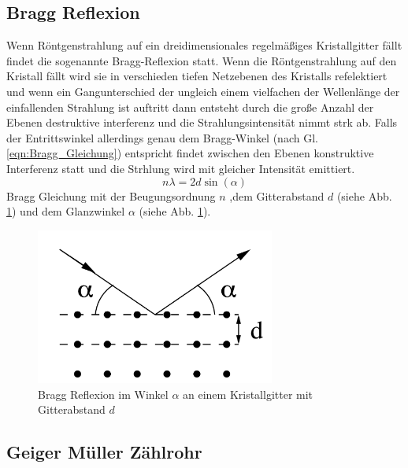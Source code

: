 \subsection{Bragg Reflexion}
Wenn Röntgenstrahlung auf ein dreidimensionales regelmäßiges Kristallgitter fällt findet die sogenannte Bragg-Reflexion statt.
Wenn die Röntgenstrahlung auf den Kristall fällt wird sie in verschieden tiefen Netzebenen des Kristalls refelektiert und wenn ein Gangunterschied der ungleich einem vielfachen der Wellenlänge der einfallenden Strahlung ist auftritt dann entsteht durch die große Anzahl der Ebenen destruktive interferenz und die Strahlungsintensität nimmt strk ab.
Falls der Entrittswinkel allerdings genau dem Bragg-Winkel (nach Gl. \ref{eqn:Bragg_Gleichung}) entspricht findet zwischen den Ebenen konstruktive Interferenz statt und die Strhlung wird mit gleicher Intensität emittiert.
\begin{equation}
    n\lambda = 2 d \sin(\alpha) \label{eqn:Bragg_Gleichung}
\end{equation}
Bragg Gleichung mit der Beugungsordnung $n$ ,dem Gitterabstand $d$ (siehe Abb. \ref{fig:Bragg_Reflexion}) und dem Glanzwinkel $\alpha$ (siehe Abb. \ref{fig:Bragg_Reflexion}).
\begin{figure}
    \centering
    \includegraphics[width=0.7\textwidth]{bilder/Bragg_Reflexion.png}
    \caption{Bragg Reflexion im Winkel $\alpha$ an einem Kristallgitter mit Gitterabstand $d$ }
    \label{fig:Bragg_Reflexion}
\end{figure}
\subsection{Geiger Müller Zählrohr}


